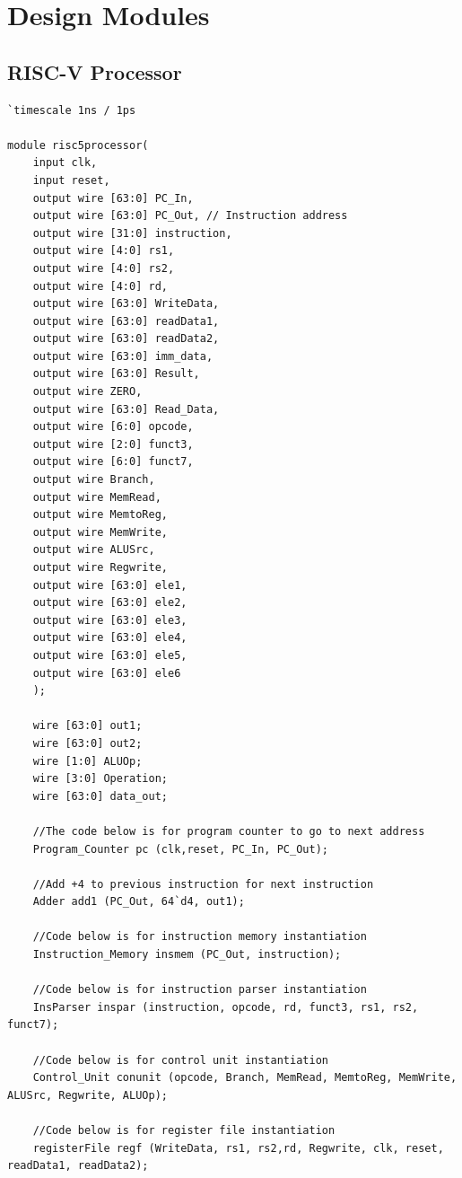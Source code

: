 \documentclass{article}
\begin{document}
\section{Design Modules}

\subsection{RISC-V Processor}

\begin{lstlisting}[caption={RISC-V Design Module Code}, captionpos=b, language=RISC-V]
`timescale 1ns / 1ps

module risc5processor(
    input clk,
    input reset,
    output wire [63:0] PC_In,
    output wire [63:0] PC_Out, // Instruction address
    output wire [31:0] instruction,
    output wire [4:0] rs1, 
    output wire [4:0] rs2, 
    output wire [4:0] rd,
    output wire [63:0] WriteData,
    output wire [63:0] readData1,
    output wire [63:0] readData2,
    output wire [63:0] imm_data,
    output wire [63:0] Result,
    output wire ZERO,
    output wire [63:0] Read_Data,
    output wire [6:0] opcode,
    output wire [2:0] funct3,
    output wire [6:0] funct7,
    output wire Branch,
    output wire MemRead,
    output wire MemtoReg,
    output wire MemWrite,
    output wire ALUSrc,
    output wire Regwrite,
    output wire [63:0] ele1,
    output wire [63:0] ele2,
    output wire [63:0] ele3,
    output wire [63:0] ele4,
    output wire [63:0] ele5,
    output wire [63:0] ele6
    );

    wire [63:0] out1;
    wire [63:0] out2;
    wire [1:0] ALUOp;
    wire [3:0] Operation;
    wire [63:0] data_out;
    
    //The code below is for program counter to go to next address
    Program_Counter pc (clk,reset, PC_In, PC_Out);
    
    //Add +4 to previous instruction for next instruction
    Adder add1 (PC_Out, 64`d4, out1);
    
    //Code below is for instruction memory instantiation
    Instruction_Memory insmem (PC_Out, instruction);
    
    //Code below is for instruction parser instantiation
    InsParser inspar (instruction, opcode, rd, funct3, rs1, rs2, funct7);
    
    //Code below is for control unit instantiation
    Control_Unit conunit (opcode, Branch, MemRead, MemtoReg, MemWrite, ALUSrc, Regwrite, ALUOp);
    
    //Code below is for register file instantiation
    registerFile regf (WriteData, rs1, rs2,rd, Regwrite, clk, reset, readData1, readData2); 
    

\end{lstlisting}
\end{document}
